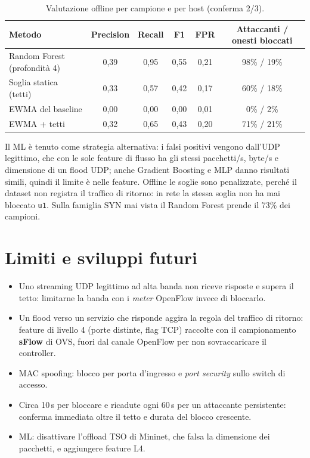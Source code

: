 \documentclass[11pt,a4paper]{article}
\newcommand{\code}[1]{\texttt{#1}}
\begin{document}
\begin{table}[H]
\centering\small
\begin{tabular}{@{}lccccc@{}}
\toprule
Metodo & Precision & Recall & F1 & FPR & Attaccanti / onesti bloccati \\
\midrule
Random Forest (profondit\`a 4) & 0,39 & 0,95 & 0,55 & 0,21 & 98\% / 19\% \\
Soglia statica (tetti) & 0,33 & 0,57 & 0,42 & 0,17 & 60\% / 18\% \\
EWMA del baseline & 0,00 & 0,00 & 0,00 & 0,01 & 0\% / 2\% \\
EWMA + tetti & 0,32 & 0,65 & 0,43 & 0,20 & 71\% / 21\% \\
\bottomrule
\end{tabular}
\caption{Valutazione offline per campione e per host (conferma 2/3).}
\end{table}

Il ML \`e tenuto come strategia alternativa: i falsi positivi vengono dall'UDP legittimo, che con
le sole feature di flusso ha gli stessi pacchetti/s, byte/s e dimensione di un flood UDP; anche
Gradient Boosting e MLP danno risultati simili, quindi il limite \`e nelle feature. Offline le
soglie sono penalizzate, perch\'e il dataset non registra il traffico di ritorno: in rete la stessa
soglia non ha mai bloccato \code{u1}. Sulla famiglia SYN mai vista il Random Forest prende il 73\%
dei campioni.

\section{Limiti e sviluppi futuri}
\begin{itemize}
  \item Uno streaming UDP legittimo ad alta banda non riceve risposte e supera il tetto: limitarne
        la banda con i \emph{meter} OpenFlow invece di bloccarlo.
  \item Un flood verso un servizio che risponde aggira la regola del traffico di ritorno: feature
        di livello 4 (porte distinte, flag TCP) raccolte con il campionamento \textbf{sFlow} di OVS,
        fuori dal canale OpenFlow per non sovraccaricare il controller.
  \item MAC spoofing: blocco per porta d'ingresso e \emph{port security} sullo switch di accesso.
  \item Circa 10\,s per bloccare e ricadute ogni 60\,s per un attaccante persistente: conferma
        immediata oltre il tetto e durata del blocco crescente.
  \item ML: disattivare l'offload TSO di Mininet, che falsa la dimensione dei pacchetti, e
        aggiungere feature L4.
\end{itemize}
\end{document}

